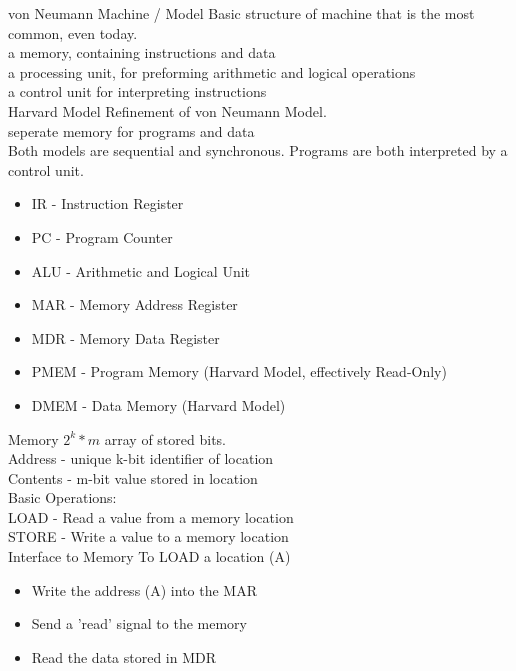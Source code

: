 \documentclass{article}
\begin{document}
\noindent
\Large
von Neumann Machine / Model
\normalsize
\noindent
Basic structure of machine that is the most common, even today.\\
a memory, containing instructions and data\\
a processing unit, for preforming arithmetic and logical operations\\
a control unit for interpreting instructions\\

\noindent
\Large
Harvard Model
\normalsize
\noindent
Refinement of von Neumann Model.\\
seperate memory for programs and data\\

Both models are sequential and synchronous. Programs are both interpreted by a control unit.

\begin{itemize}
  \item IR - Instruction Register
  \item PC - Program Counter
  \item ALU - Arithmetic and Logical Unit
  \item MAR - Memory Address Register
  \item MDR - Memory Data Register
  \item PMEM - Program Memory (Harvard Model, effectively Read-Only)
  \item DMEM - Data Memory (Harvard Model)
\end{itemize}

\noindent
\Large
Memory
\normalsize
\noindent
$2^k * m$ array of stored bits.\\
Address - unique k-bit identifier of location\\
Contents - m-bit value stored in location\\

Basic Operations:\\
LOAD - Read a value from a memory location\\
STORE - Write a value to a memory location\\

\noindent
\Large
Interface to Memory
\normalsize
\noindent
To LOAD a location (A)
\begin{itemize}
  \item Write the address (A) into the MAR
  \item Send a 'read' signal to the memory
  \item Read the data stored in MDR
\end{itemize}
\end{document}
